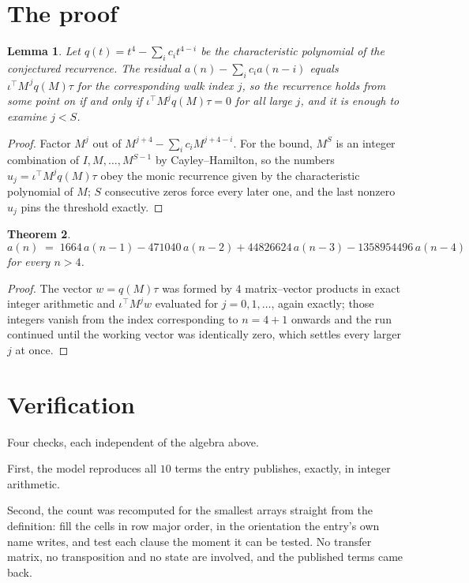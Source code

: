 \documentclass[11pt,a4paper]{article}
\theoremstyle{plain}
\newtheorem{theorem}{Theorem}
\newtheorem{lemma}[theorem]{Lemma}
\theoremstyle{definition}
\begin{document}
\section{The proof}

\begin{lemma}\label{lem:crit}
Let $q(t)=t^{4}-\sum_i c_it^{4-i}$ be the characteristic polynomial of the
conjectured recurrence. The residual $a(n)-\sum_ic_ia(n-i)$ equals
$\iota^{\!\top}M^{\,j}q(M)\tau$ for the corresponding walk index $j$, so the recurrence
holds from some point on if and only if $\iota^{\!\top}M^{j}q(M)\tau=0$ for all large $j$,
and it is enough to examine $j<S$.
\end{lemma}

\begin{proof}
Factor $M^{j}$ out of $M^{j+4}-\sum_ic_iM^{j+4-i}$. For the bound, $M^{S}$
is an integer combination of $I,M,\dots,M^{S-1}$ by Cayley--Hamilton, so the numbers
$u_j=\iota^{\!\top}M^{j}q(M)\tau$ obey the monic recurrence given by the characteristic
polynomial of $M$; $S$ consecutive zeros force every later one, and the last nonzero $u_j$
pins the threshold exactly.
\end{proof}

\begin{theorem}
\[
a(n)\;=\;1664\,a(n-1) - 471040\,a(n-2) + 44826624\,a(n-3) - 1358954496\,a(n-4)
\]
for every $n>4$.
\end{theorem}

\begin{proof}
The vector $w=q(M)\tau$ was formed by $4$ matrix--vector products in exact integer
arithmetic and $\iota^{\!\top}M^{j}w$ evaluated for $j=0,1,\dots$, again exactly; those
integers vanish from the index corresponding to $n=4+1$ onwards and the run continued
until the working vector was identically zero, which settles every larger $j$ at once.
\end{proof}

\section{Verification}

Four checks, each independent of the algebra above.

First, the model reproduces all $10$ terms the entry publishes, exactly, in integer
arithmetic.

Second, the count was recomputed for the smallest arrays straight from the definition: fill the
cells in row major order, in the orientation the entry's own name writes, and test each clause
the moment it can be tested. No transfer matrix, no transposition and no state are involved,
and the published terms came back.
\end{document}
